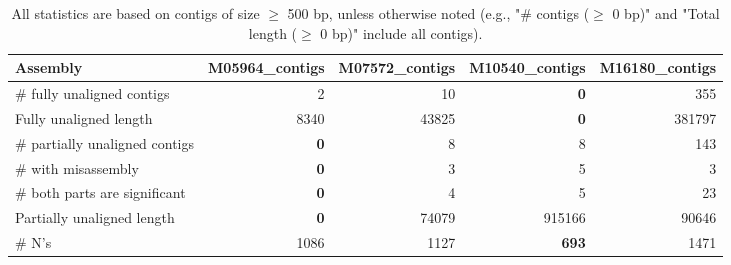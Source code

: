 \documentclass[12pt,a4paper]{article}
\begin{document}
\begin{table}[ht]
\begin{center}
\caption{All statistics are based on contigs of size $\geq$ 500 bp, unless otherwise noted (e.g., "\# contigs ($\geq$ 0 bp)" and "Total length ($\geq$ 0 bp)" include all contigs).}
\begin{tabular}{|l*{4}{|r}|}
\hline
Assembly & M05964\_contigs & M07572\_contigs & M10540\_contigs & M16180\_contigs \\ \hline
\# fully unaligned contigs & 2 & 10 & {\bf 0} & 355 \\ \hline
Fully unaligned length & 8340 & 43825 & {\bf 0} & 381797 \\ \hline
\# partially unaligned contigs & {\bf 0} & 8 & 8 & 143 \\ \hline
\hspace{5mm}\# with misassembly & {\bf 0} & 3 & 5 & 3 \\ \hline
\hspace{5mm}\# both parts are significant & {\bf 0} & 4 & 5 & 23 \\ \hline
Partially unaligned length & {\bf 0} & 74079 & 915166 & 90646 \\ \hline
\# N's & 1086 & 1127 & {\bf 693} & 1471 \\ \hline
\end{tabular}
\end{center}
\end{table}
\end{document}
